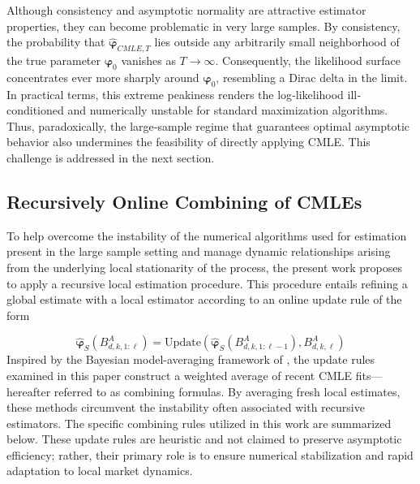 \documentclass{rQUF2e}
\theoremstyle{plain}
\theoremstyle{definition}
\theoremstyle{remark}
\begin{document}
Although consistency and asymptotic normality are attractive estimator properties, they can become problematic in very large samples.  By consistency, the probability that \(\hat{\boldsymbol{\varphi}}_{CMLE,T}\) lies outside any arbitrarily small neighborhood of the true parameter \(\boldsymbol{\varphi}_0\) vanishes as \(T\to\infty\).  Consequently, the likelihood surface concentrates ever more sharply around \(\boldsymbol{\varphi}_0\), resembling a Dirac delta in the limit.  In practical terms, this extreme peakiness renders the log‐likelihood ill‐conditioned and numerically unstable for standard maximization algorithms.  Thus, paradoxically, the large‐sample regime that guarantees optimal asymptotic behavior also undermines the feasibility of directly applying CMLE. This challenge is addressed in the next section.


\subsection{Recursively Online Combining of CMLEs}
\label{subsec:combining_cmles}

To help overcome the instability of the numerical algorithms used for estimation present in the large sample setting and manage dynamic relationships arising from the underlying local stationarity of the process, the present work proposes to apply a recursive local estimation procedure. This procedure entails refining a global estimate with a local estimator according to an online update rule of the form

$$
    \hat{\boldsymbol{\varphi}}_S\left( B^A_{d,k,1:\ell} \right) = \mathrm{Update}\left( \hat{\boldsymbol{\varphi}}_S\left( B^A_{d,k,1:\ell - 1} \right),  B^A_{d,k,\ell} \right)
$$
Inspired by the Bayesian model-averaging framework of \citep{madigan2003bayesian}, the update rules examined in this paper construct a weighted average of recent CMLE fits—hereafter referred to as combining formulas. By averaging fresh local estimates, these methods circumvent the instability often associated with recursive estimators. The specific combining rules utilized in this work are summarized below. These update rules are heuristic and not claimed to preserve asymptotic efficiency; rather, their primary role is to ensure numerical stabilization and rapid adaptation to local market dynamics.

\end{document}
